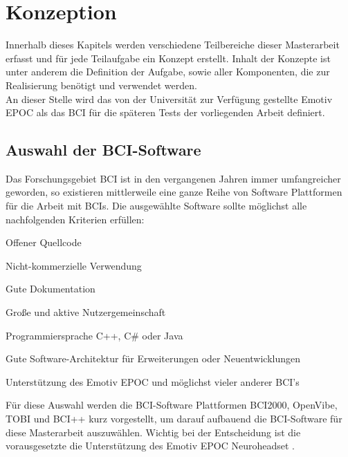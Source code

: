 \chapter{Konzeption}

Innerhalb dieses Kapitels werden verschiedene Teilbereiche dieser Masterarbeit erfasst und für jede Teilaufgabe ein Konzept erstellt.
Inhalt der Konzepte ist unter anderem die Definition der Aufgabe, sowie aller Komponenten, die zur Realisierung benötigt und verwendet werden.\\

An dieser Stelle wird das von der Universität zur Verfügung gestellte Emotiv EPOC als das \acs{BCI} für die späteren Tests der vorliegenden Arbeit definiert. \\


\section{Auswahl der BCI-Software}

Das Forschungsgebiet \acs{BCI} ist in den vergangenen Jahren immer umfangreicher geworden, so existieren mittlerweile eine ganze Reihe von Software Plattformen für die Arbeit mit \acs{BCI}s.
Die ausgewählte Software sollte möglichst alle nachfolgenden Kriterien erfüllen:

\begin{itemize}
\setlength{\itemsep}{0pt}
\footnotesize
{
\item Offener Quellcode
\item Nicht-kommerzielle Verwendung
\item Gute Dokumentation
\item Große und aktive Nutzergemeinschaft
\item Programmiersprache C++, C\# oder Java
\item Gute Software-Architektur für Erweiterungen oder Neuentwicklungen
\item Unterstützung des Emotiv EPOC und möglichst vieler anderer \acs{BCI}'s\\
}
\end{itemize}

Für diese Auswahl werden die \acs{BCI}-Software Plattformen BCI2000, OpenVibe, TOBI und BCI++ kurz vorgestellt, um darauf aufbauend die \acs{BCI}-Software für diese Masterarbeit auszuwählen.
Wichtig bei der Entscheidung ist die vorausgesetzte die Unterstützung des Emotiv EPOC Neuroheadset \cite{Emotiv2014}. \\


